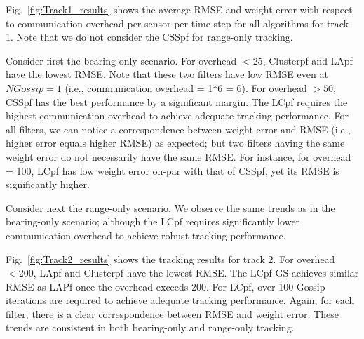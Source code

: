 \documentclass[10pt,letterpaper,final]{article}
\begin{document}
Fig.~\ref{fig:Track1_results} shows the average RMSE and weight error with respect to communication overhead per sensor per time step for all algorithms for track 1. Note that we do not consider the CSSpf for range-only tracking. 

Consider first the bearing-only scenario. For overhead $< 25$, Clusterpf and LApf have the lowest RMSE. Note that these two filters have low RMSE even at $NGossip=1$ (i.e., communication overhead = 1*6 = 6). For overhead $> 50$, CSSpf has the best performance by a significant margin. The LCpf requires the highest communication overhead to achieve adequate tracking performance. For all filters, we can notice a correspondence between weight error and RMSE (i.e., higher error equals higher RMSE) as expected; but two filters having the same weight error do not necessarily have the same RMSE. For instance, for overhead = 100, LCpf has low weight error on-par with that of CSSpf, yet its RMSE is significantly higher. 

Consider next the range-only scenario. We observe the same trends as in the bearing-only scenario; although the LCpf requires significantly lower communication overhead to achieve robust tracking performance. 

Fig.~\ref{fig:Track2_results} shows the tracking results for track 2. For overhead $< 200$, LApf and Clusterpf have the lowest RMSE. The LCpf-GS achieves similar RMSE as LAPf once the overhead exceeds 200. For LCpf, over 100 Gossip iterations are required to achieve adequate tracking performance. Again, for each filter, there is a clear correspondence between RMSE and weight error. These trends are consistent in both bearing-only and range-only tracking. 
\end{document}
